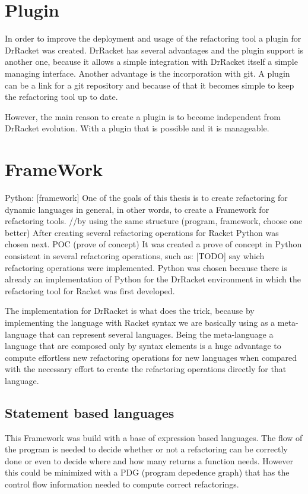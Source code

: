 
\section{Plugin}
In order to improve the deployment and usage of the refactoring tool a plugin
for DrRacket was created.
DrRacket has several advantages and the plugin support is another one, because
it allows a simple integration with DrRacket itself a simple managing interface.
Another advantage is the incorporation with git. A plugin can be a link for a git
repository and because of that it becomes simple to keep the refactoring tool up to date.

However, the main reason to create a plugin is to become independent from DrRacket
evolution. With a plugin that is possible and it is manageable.
\section{FrameWork}
Python: [framework]
One of the goals of this thesis is to create refactoring for dynamic languages in general,
in other words, to create a Framework for refactoring tools.
//by using the same structure (program, framework, choose one better)
After creating several refactoring operations for Racket Python was chosen next.
POC (prove of concept)
It was created a prove of concept in Python consistent in several refactoring operations, such as:
[TODO] say which refactoring operations were implemented.
Python was chosen because there is already an implementation of Python for the
 DrRacket environment in which the refactoring tool for Racket was first developed.


 The implementation for DrRacket is what does the trick, because by implementing
 the language with Racket syntax we are basically using as a meta-language that
 can represent several languages. Being the meta-language a language that are
 composed only by syntax elements is a huge advantage to compute effortless new
 refactoring operations for new languages when compared with the necessary effort to create
 the refactoring operations directly for that language.

\subsection{Statement based languages}
This Framework was build with a base of expression based languages. The flow of
the program is needed to decide whether or not a refactoring can be correctly done
or even to decide where and how many returns a function needs. However this could
be minimized with a PDG (program depedence graph) that has the control flow information
needed to compute correct refactorings.


